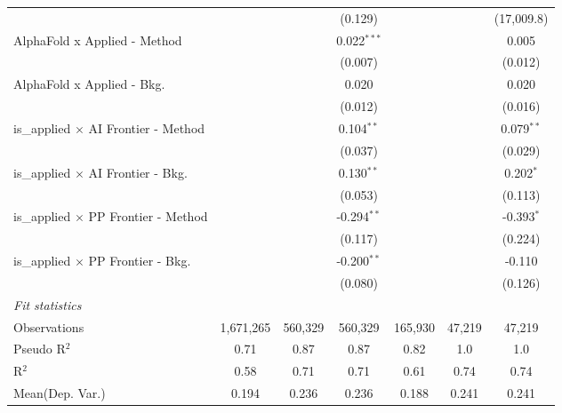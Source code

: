 \begin{tabular}{lcccccc}
                                               &                &                & (0.129)        &                &                & (17,009.8)\\   
   AlphaFold x Applied - Method                &                &                & 0.022$^{***}$  &                &                & 0.005\\   
                                               &                &                & (0.007)        &                &                & (0.012)\\   
   AlphaFold x Applied - Bkg.                  &                &                & 0.020          &                &                & 0.020\\   
                                               &                &                & (0.012)        &                &                & (0.016)\\   
   is\_applied $\times$ AI Frontier - Method   &                &                & 0.104$^{**}$   &                &                & 0.079$^{**}$\\   
                                               &                &                & (0.037)        &                &                & (0.029)\\   
   is\_applied $\times$ AI Frontier - Bkg.     &                &                & 0.130$^{**}$   &                &                & 0.202$^{*}$\\   
                                               &                &                & (0.053)        &                &                & (0.113)\\   
   is\_applied $\times$ PP Frontier - Method   &                &                & -0.294$^{**}$  &                &                & -0.393$^{*}$\\   
                                               &                &                & (0.117)        &                &                & (0.224)\\   
   is\_applied $\times$ PP Frontier - Bkg.     &                &                & -0.200$^{**}$  &                &                & -0.110\\   
                                               &                &                & (0.080)        &                &                & (0.126)\\   
   \midrule
   \emph{Fit statistics}\\
   Observations                                & 1,671,265      & 560,329        & 560,329        & 165,930        & 47,219         & 47,219\\  
   Pseudo R$^2$                                & 0.71           & 0.87           & 0.87           & 0.82           & 1.0            & 1.0\\  
   R$^2$                                       & 0.58           & 0.71           & 0.71           & 0.61           & 0.74           & 0.74\\  
Mean(Dep. Var.) & 0.194 & 0.236 & 0.236 & 0.188 & 0.241 & 0.241 \\
   

\end{tabular}
